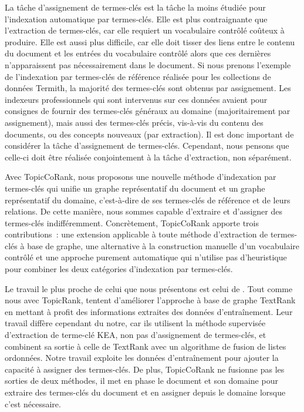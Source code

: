     La tâche d'assignement de termes-clés est la tâche la moins étudiée pour
    l'indexation automatique par termes-clés. Elle est plus contraignante que
    l'extraction de termes-clés, car elle requiert un vocabulaire contrôlé
    coûteux à produire. Elle est aussi plus difficile, car elle doit tisser des
    liens entre le contenu du document et les entrées du vocabulaire contrôlé
    alors que ces dernières n'apparaissent pas nécessairement dans le document.
    Si nous prenons l'exemple de l'indexation par termes-clés de référence
    réalisée pour les collections de données Termith, la majorité des
    termes-clés sont obtenus par assignement. Les indexeurs professionnels qui
    sont intervenus sur ces données avaient pour consignes de fournir des
    termes-clés généraux au domaine (majoritairement par assignement), mais
    aussi  des termes-clés précis, vis-à-vis du contenu des documents, ou des
    concepts nouveaux (par extraction). Il est donc important de considérer la
    tâche d'assignement de termes-clés. Cependant, nous pensons que celle-ci
    doit être réalisée conjointement à la tâche d'extraction, non séparément.

    Avec TopicCoRank, nous proposons une nouvelle méthode d'indexation par
    termes-clés qui unifie un graphe représentatif du document et un graphe
    représentatif du domaine, c'est-à-dire de ses termes-clés de référence et de
    leurs relations. De cette manière, nous sommes capable d'extraire et
    d'assigner des termes-clés indifféremment. Concrètement, TopicCoRank apporte
    trois contributions~: une extension applicable à toute méthode d'extraction
    de termes-clés à base de graphe, une alternative à la construction manuelle
    d'un vocabulaire contrôlé et une approche purement automatique qui n'utilise
    pas d'heuristique pour combiner les deux catégories d'indexation par
    termes-clés.
        
    Le travail le plus proche de celui que nous présentons est celui de
    . Tout comme nous avec TopicRank,
     tentent d'améliorer l'approche à
    base de graphe TextRank en mettant à profit des informations extraites des
    données d'entraînement. Leur travail diffère cependant du notre, car ils
    utilisent la méthode supervisée d'extraction de terme-clé KEA, non pas
    d'assignement de termes-clés, et combinent sa sortie à celle de TextRank
    avec un algorithme de fusion de listes ordonnées. Notre travail exploite les
    données d'entraînement pour ajouter la capacité à assigner des termes-clés.
    De plus, TopicCoRank ne fusionne pas les sorties de deux méthodes, il met en
    phase le document et son domaine pour extraire des termes-clés du document
    et en assigner depuis le domaine lorsque c'est nécessaire.

